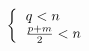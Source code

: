 \begin{equation}
\left \{ \begin{tabular}{l} $q<n$ \\ $\frac{p+m}{2}<n$ \end{tabular} \right. 
\end{equation}

